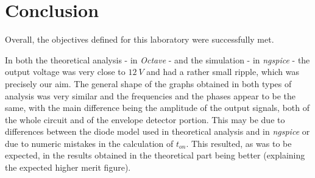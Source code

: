 \section{Conclusion}
\label{sec:conclusion}

Overall, the objectives defined for this laboratory were successfully met.

In both the theoretical analysis - in \textit{Octave} - and the simulation - in \textit{ngspice} - the output voltage was very close to $12 \ V$ and had a rather small ripple, which was precisely our aim. The general shape of the graphs obtained in both types of analysis was very similar and the frequencies and the phases appear to be the same, with the main difference being the amplitude of the output signals, both of the whole circuit and of the envelope detector portion. This may be due to differences between the diode model used in theoretical analysis and in \textit{ngspice} or due to numeric mistakes in the calculation of \textit{$t_{on}$}. This resulted, as was to be expected, in the results obtained in the theoretical part being better (explaining the expected higher merit figure).

